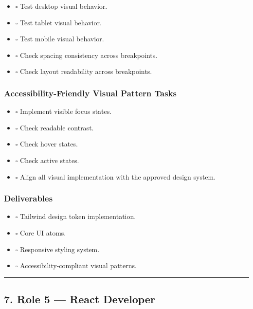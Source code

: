 \documentclass[12pt,a4paper]{article}
\providecommand{\tightlist}{\setlength{\itemsep}{0pt}\setlength{\parskip}{0pt}}
\begin{document}
\begin{itemize}
\tightlist
\item
  \(\square\) Test desktop visual behavior.
\item
  \(\square\) Test tablet visual behavior.
\item
  \(\square\) Test mobile visual behavior.
\item
  \(\square\) Check spacing consistency across breakpoints.
\item
  \(\square\) Check layout readability across breakpoints.
\end{itemize}

\subsubsection{Accessibility-Friendly Visual Pattern Tasks}\label{accessibility-friendly-visual-pattern-tasks}

\begin{itemize}
\tightlist
\item
  \(\square\) Implement visible focus states.
\item
  \(\square\) Check readable contrast.
\item
  \(\square\) Check hover states.
\item
  \(\square\) Check active states.
\item
  \(\square\) Align all visual implementation with the approved design system.
\end{itemize}

\subsubsection{Deliverables}\label{deliverables-2}

\begin{itemize}
\tightlist
\item
  \(\square\) Tailwind design token implementation.
\item
  \(\square\) Core UI atoms.
\item
  \(\square\) Responsive styling system.
\item
  \(\square\) Accessibility-compliant visual patterns.
\end{itemize}

\begin{center}\rule{0.5\linewidth}{0.5pt}\end{center}

\subsection{7. Role 5 --- React Developer}\label{role-5-react-developer}
\end{document}

